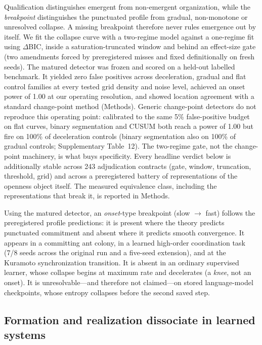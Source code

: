 \documentclass[11pt]{article}
\begin{document}
Qualification distinguishes emergent from non-emergent organization,
while the \emph{breakpoint} distinguishes the punctuated profile from
gradual, non-monotone or unresolved collapse. A missing breakpoint
therefore never rules emergence out by itself. We fit the
collapse curve with a two-regime model against a one-regime fit using
$\Delta$BIC, inside a saturation-truncated window and behind an
effect-size gate (two amendments forced by preregistered misses and
fixed definitionally on fresh seeds). The matured
detector was frozen and scored on a held-out labelled benchmark. It
yielded zero false positives across deceleration, gradual and flat
control families at every tested grid density and noise level,
achieved an onset power of 1.00 at our operating resolution, and
showed location agreement with a standard change-point method
(Methods). Generic change-point detectors do not reproduce this
operating point: calibrated to the same 5\% false-positive budget on
flat curves, binary segmentation and CUSUM both reach a power of 1.00
but fire on 100\% of deceleration controls (binary segmentation also
on 100\% of gradual controls; Supplementary Table~12). The two-regime
gate, not the change-point machinery, is what buys specificity. Every headline verdict below is additionally stable across
243 adjudication contracts (gate, window, truncation, threshold, grid)
and across a preregistered battery of representations of the openness
object itself. The measured equivalence class, including the
representations that break it, is reported in Methods.

Using the matured detector, an \emph{onset}-type breakpoint (slow $\to$
fast) follows the preregistered profile predictions: it is present where
the theory predicts punctuated commitment and absent where it predicts
smooth convergence. It appears in a committing ant
colony, in a learned high-order coordination task (7/8 seeds across
the original run and a five-seed extension), and at the Kuramoto
synchronization transition\citep{kuramoto1984chemical,strogatz2000kuramoto}.
It is absent in an ordinary supervised learner, whose collapse
begins at maximum rate and decelerates (a \emph{knee}, not an onset).
It is unresolvable---and therefore not claimed---on stored language-model
checkpoints, whose entropy collapses before the second saved step.

\subsection*{Formation and realization dissociate in learned systems}
\end{document}
